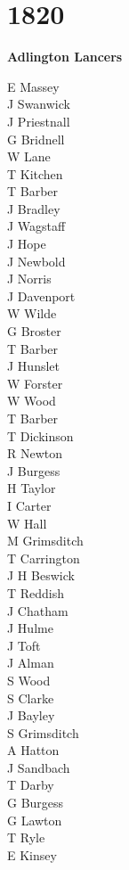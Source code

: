 \chapter*{1820}

\vspace*{10mm}

\begin{center}
  \Large
  \textbf{Adlington Lancers}
\end{center}

\vspace*{10mm}

\begin{multicols}{2}
  \noindent
  E Massey \\
  J Swanwick \\
  J Priestnall \\
  G Bridnell \\
  W Lane \\
  T Kitchen \\
  T Barber \\
  J Bradley \\
  J Wagstaff \\
  J Hope \\
  J Newbold \\
  J Norris \\
  J Davenport \\
  W Wilde \\
  G Broster \\
  T Barber \\
  J Hunslet \\
  W Forster \\
  W Wood \\
  T Barber \\
  T Dickinson \\
  R Newton \\
  J Burgess \\
  H Taylor \\
  I Carter \\
  W Hall \\
  M Grimsditch \\
  T Carrington \\
  J H Beswick \\
  T Reddish \\
  J Chatham \\
  J Hulme \\
  J Toft \\
  J Alman \\
  S Wood \\
  S Clarke \\
  J Bayley \\
  S Grimsditch \\
  A Hatton \\
  J Sandbach \\
  T Darby \\
  G Burgess \\
  G Lawton \\
  T Ryle \\
  E Kinsey \\
\end{multicols}
